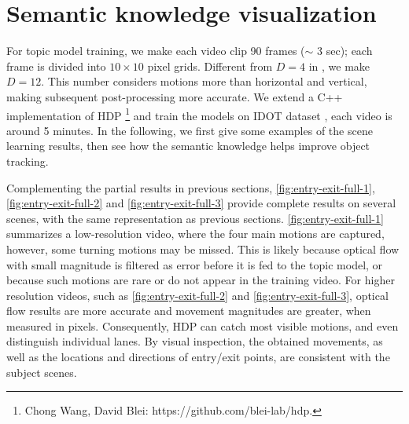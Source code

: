 \section{Semantic knowledge visualization}

For topic model training, we make each video clip 90 frames ($\sim$ 3 sec); each frame is divided into $10\times10$ pixel grids. Different from $D=4$ in \cite{wang2009unsupervised,kuettel2010s}, we make $D=12$. This number considers motions more than horizontal and vertical, making subsequent post-processing more accurate. 
We extend a C++ implementation of HDP \footnote{Chong Wang, David Blei: https://github.com/blei-lab/hdp.} and train the models on IDOT dataset \cite{yanziVehicleTracker}, each video is around 5 minutes. 
In the following, we first give some examples of the scene learning results, then see how the semantic knowledge helps improve object tracking.

Complementing the partial results in previous sections, \ref{fig:entry-exit-full-1}, \ref{fig:entry-exit-full-2} and \ref{fig:entry-exit-full-3} provide complete results on several scenes, 
with the same representation as previous sections.
\ref{fig:entry-exit-full-1} summarizes a low-resolution video, where the four main motions are captured, however, some turning motions may be missed. This is likely because optical flow with small magnitude is filtered as error before it is fed to the topic model, or because such motions are rare or do not appear in the training video.
For higher resolution videos, such as \ref{fig:entry-exit-full-2} and \ref{fig:entry-exit-full-3}, optical flow results are more accurate and movement magnitudes are greater, when measured in pixels. Consequently, HDP can catch most visible motions, and even distinguish individual lanes.
By visual inspection, the obtained movements, as well as the locations and directions of entry/exit points, are consistent with the subject scenes. 

